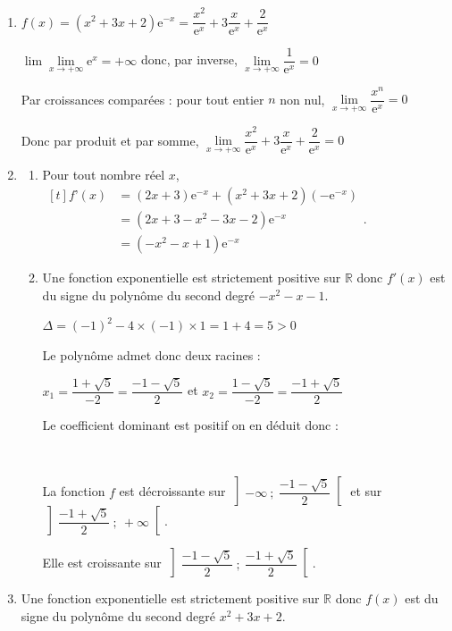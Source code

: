 \documentclass[10pt]{article}
\providecommand{\R}{\mathbb{R}}
\providecommand{\e}{{\mathrm{e}}}
\begin{document}
\begin{enumerate}
\item $f(x)=\left(x^{2}+3 x+2\right) \e^{-x} = \dfrac{x^2}{\e^x}+3 \dfrac{x}{\e^x} + \dfrac{2}{\e^x}$

$\lim\lim\limits_{x\to +\infty }\e^x= +\infty$ donc, par inverse, $\lim\limits_{x\to +\infty }\dfrac{1}{\e^x}=0$

Par croissances comparées : pour tout entier $n$ non nul, $\lim\limits_{x\to +\infty} \dfrac{x^n}{\e^x}= 0$
		
Donc par produit et par somme, $\lim\limits_{x \to +\infty} \dfrac{x^2}{\e^x}+3 \dfrac{x}{\e^x} + \dfrac{2}{\e^x} = 0$
\item 
	\begin{enumerate}
		\item Pour tout nombre réel $x$, 
$\begin{aligned}[t] f’(x)& =\left(2x+3\right) \e^{-x} + \left(x^2+3x+2\right)\left(-\e^{-x}\right)\\
	& = \left( 2x+3-x^2-3x-2\right)\e^{-x}\\
	& = \left(-x^2-x+1\right)\e^{-x}
\end{aligned}$.
\item Une fonction exponentielle est strictement positive sur $\R$ donc $f'(x)$ est du signe du polynôme du second degré $-x^2-x-1$. 

$\Delta=(-1)^2-4 \times (-1)\times 1= 1+4=5>0$

Le polynôme admet donc deux racines : 

$x_1= \dfrac{1+\sqrt{5}}{-2}= \dfrac{-1-\sqrt{5}}{2}$ \quad et \quad $x_2= \dfrac{1-\sqrt{5}}{-2}= \dfrac{-1+\sqrt{5}}{2}$

Le coefficient dominant est positif on en déduit donc :




\hfill~

La fonction $f$ est décroissante sur $\left] -\infty~;~\dfrac{-1-\sqrt{5}}{2}\right[$ et sur $\left] \dfrac{-1+\sqrt{5}}{2}~;~ +\infty \right[$.

Elle est croissante sur $\left]\dfrac{-1-\sqrt{5}}{2}~;~\dfrac{-1+\sqrt{5}}{2}\right[$.
	\end{enumerate}
\item Une fonction exponentielle est strictement positive sur $\R$ donc $f(x)$ est du signe du polynôme du second degré $x^2 + 3x + 2$.


\end{enumerate}
\end{document}
